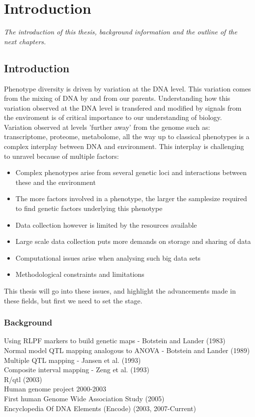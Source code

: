 \chapter{Introduction}
\emph{The introduction of this thesis, background information and the outline of the next chapters.}

\null
\vfill
\newpage

\section{Introduction}

Phenotype diversity is driven by variation at the DNA level. This variation comes from the mixing of 
DNA by and from our parents. Understanding how this variation observed at the DNA level is transfered 
and modified by signals from the enviroment is of critical importance to our understanding of 
biology. Variation observed at levels 'further away' from the genome such as: transcriptome, proteome, 
metabolome, all the way up to classical phenotypes is a complex interplay between DNA and 
environment. This interplay is challenging to unravel because of multiple factors:\\
\begin{itemize}
\item Complex phenotypes arise from several genetic loci and interactions between these and the 
environment
\item The more factors involved in a phenotype, the larger the samplesize required to find genetic 
factors underlying this phenotype
\item Data collection however is limited by the resources available
\item Large scale data collection puts more demands on storage and sharing of data
\item Computational issues arise when analysing such big data sets
\item Methodological constraints and limitations
\end{itemize}

This thesis will go into these issues, and highlight the advancements made in these 
fields, but first we need to set the stage.

\subsection{Background}

Using RLPF markers to build genetic maps - Botstein and Lander (1983)\\
Normal model QTL mapping analogous to ANOVA - Botstein and Lander (1989)\\
Multiple QTL mapping - Jansen et al. (1993)\\
Composite interval mapping -  Zeng et al. (1993)\\
R/qtl (2003)\\
Human genome project 2000-2003\\
First human Genome Wide Association Study (2005)\\
Encyclopedia Of DNA Elements (Encode) (2003, 2007-Current)


